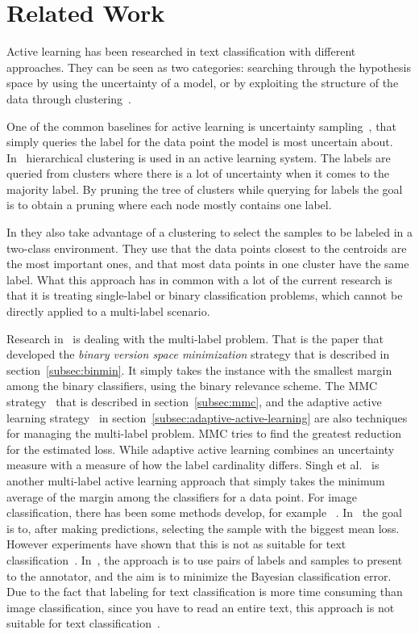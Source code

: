 \section{Related Work}

Active learning has been researched in text classification with different approaches.
They can be seen as two categories: searching through the hypothesis space by using the uncertainty of a model, or by exploiting the structure of the data through clustering~\cite{dasgupta2008hierarchical}.

One of the common baselines for active learning is uncertainty sampling~\cite{lewis1994sequential}, that simply queries the label for the data point the model is most uncertain about.
In~\cite{dasgupta2008hierarchical} hierarchical clustering is used in an active learning system.
The labels are queried from clusters where there is a lot of uncertainty when it comes to the majority label.
By pruning the tree of clusters while querying for labels the goal is to obtain a pruning where each node mostly contains one label.

In \cite{nguyen2004active} they also take advantage of a clustering to select the samples to be labeled in a two-class environment.
They use that the data points closest to the centroids are the most important ones, and that most data points in one cluster have the same label.
What this approach has in common with a lot of the current research is that it is treating single-label or binary classification problems, which cannot be directly applied to a multi-label scenario.

Research in~\cite{brinker2006active} is dealing with the multi-label problem.
That is the paper that developed the \textit{binary version space minimization} strategy that is described in section~\ref{subsec:binmin}.
It simply takes the instance with the smallest margin among the binary classifiers, using the binary relevance scheme.
The MMC strategy~\cite{yang2009effective} that is described in section~\ref{subsec:mmc}, and the adaptive active learning strategy~\cite{li2013active} in section~\ref{subsec:adaptive-active-learning} are also techniques for managing the multi-label problem.
MMC tries to find the greatest reduction for the estimated loss.
While adaptive active learning combines an uncertainty measure with a measure of how the label cardinality differs.
Singh et al\@.~\cite{singh2009active} is another multi-label active learning approach that simply takes the minimum average of the margin among the classifiers for a data point.
For image classification, there has been some methods develop, for example ~\cite{li2004multilabel, qi2008two}.
In~\cite{li2004multilabel} the goal is to, after making predictions, selecting the sample with the biggest mean loss.
However experiments have shown that this is not as suitable for text classification~\cite{yang2009effective}.
In~\cite{qi2008two}, the approach is to use pairs of labels and samples to present to the annotator, and the aim is to minimize the Bayesian classification error.
Due to the fact that labeling for text classification is more time consuming than image classification, since you have to read an entire text, this approach is not suitable for text classification~\cite{yang2009effective}.

